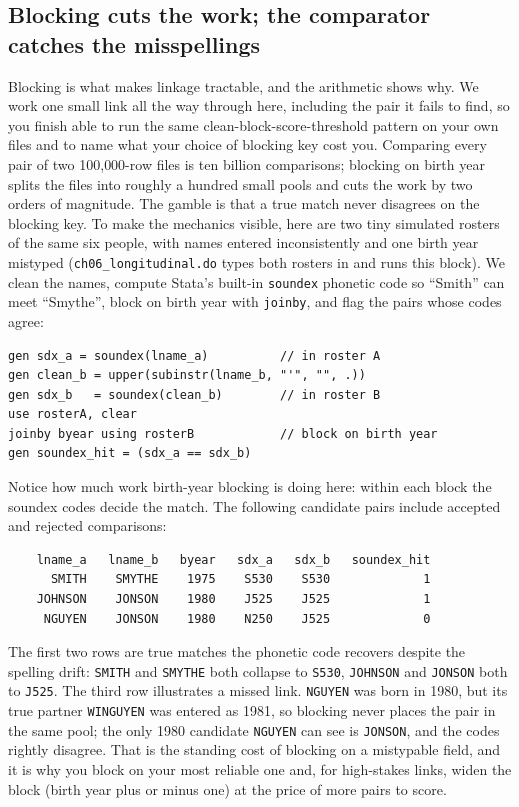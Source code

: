 \documentclass[
    a4paper,
    fontsize=10pt,
    twoside=true,
    numbers=noenddot,
]{kaobook}
\begin{document}
\subsection{Blocking cuts the work; the comparator catches the misspellings}\label{sec:ch06-blocking}
Blocking is what makes linkage tractable, and the arithmetic shows why. We work one small link all the way through here, including the pair it fails to find, so you finish able to run the same clean-block-score-threshold pattern on your own files and to name what your choice of blocking key cost you. Comparing every pair of two 100{,}000-row files is ten billion comparisons; blocking on birth year splits the files into roughly a hundred small pools and cuts the work by two orders of magnitude. The gamble is that a true match never disagrees on the blocking key. To make the mechanics visible, here are two tiny simulated rosters of the same six people, with names entered inconsistently and one birth year mistyped (\texttt{ch06\_longitudinal.do} types both rosters in and runs this block). We clean the names, compute Stata's built-in \texttt{soundex} phonetic code so \enquote{Smith} can meet \enquote{Smythe}, block on birth year with \texttt{joinby}, and flag the pairs whose codes agree:
\par
{\footnotesize
\begin{verbatim}
gen sdx_a = soundex(lname_a)          // in roster A
gen clean_b = upper(subinstr(lname_b, "'", "", .))
gen sdx_b   = soundex(clean_b)        // in roster B
use rosterA, clear
joinby byear using rosterB            // block on birth year
gen soundex_hit = (sdx_a == sdx_b)
\end{verbatim}
}
Notice how much work birth-year blocking is doing here: within each block the soundex codes decide the match. The following candidate pairs include accepted and rejected comparisons:
\par
{\footnotesize
\begin{verbatim}
    lname_a   lname_b   byear   sdx_a   sdx_b   soundex_hit
      SMITH    SMYTHE    1975    S530    S530             1
    JOHNSON    JONSON    1980    J525    J525             1
     NGUYEN    JONSON    1980    N250    J525             0
\end{verbatim}
}
The first two rows are true matches the phonetic code recovers despite the spelling drift: \texttt{SMITH} and \texttt{SMYTHE} both collapse to \texttt{S530}, \texttt{JOHNSON} and \texttt{JONSON} both to \texttt{J525}. The third row illustrates a missed link. \texttt{NGUYEN} was born in 1980, but its true partner \texttt{WINGUYEN} was entered as 1981, so blocking never places the pair in the same pool; the only 1980 candidate \texttt{NGUYEN} can see is \texttt{JONSON}, and the codes rightly disagree. That is the standing cost of blocking on a mistypable field, and it is why you block on your most reliable one and, for high-stakes links, widen the block (birth year plus or minus one) at the price of more pairs to score.
\end{document}
